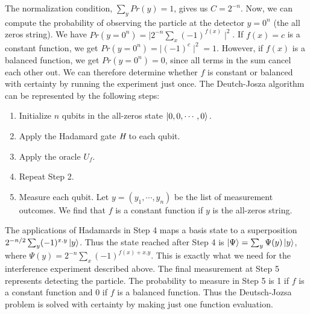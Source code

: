 \documentclass[12pt]{article}
\begin{document}
    \noindent
    The normalization condition, $\sum_{y}Pr(y) = 1$, gives us $C = 2^{-n}$. Now, we can compute the probability  of observing the particle at the detector $y = 0^n$ (the all zeros string). We have $Pr(y=0^{n}) = \mid2^{-n}\sum_{x}(-1)^{f(x)}\mid^2$. If $f(x) = c$ is a constant function, we get $Pr(y=0^{n}) = \mid(-1)^c\mid^2 = 1$. However, if $f(x)$ is a balanced function, we get $Pr(y=0^{n}) = 0$, since all terms in the sum cancel each other out. We can therefore determine whether $f$ is constant or balanced with certainty by running the experiment just once. The Deutch-Josza algorithm can be represented by the following steps:
    
    \begin{enumerate}
        \item Initialize $n$ qubits in the all-zeros state $\ket{0,0,\cdots,0}.$
        \item Apply the Hadamard gate $\mbox{\em{H}}$ to each qubit.
        \item Apply the oracle $U_{f}$.
        \item Repeat Step 2.
        \item  Measure each qubit. Let $y = (y_1, \cdots, y_n)$ be the list of measurement outcomes. We find that $f$ is a constant function if $y$ is the all-zeros string.
    \end{enumerate}
    
    \noindent
   The applications of Hadamards in Step 4 maps a basis state  to a superposition $2^{-n/2}\sum_{y}(-1)^{x.y}\ket{y}$. Thus the state reached after Step 4 is $\ket{\Psi} = \sum_{y}\Psi(y)\ket{y}$, where $\Psi (y) = 2^{-n}\sum_{x}(-1)^{f(x)+x.y}$. This is exactly what we need for the interference experiment described above. The final measurement at Step 5 represents detecting the particle. The probability to measure in Step 5 is 1 if $f$ is a constant function and 0 if $f$ is a balanced function. Thus the Deutsch-Jozsa problem is solved with certainty by making just one function evaluation.
    
    
    
\end{document}
